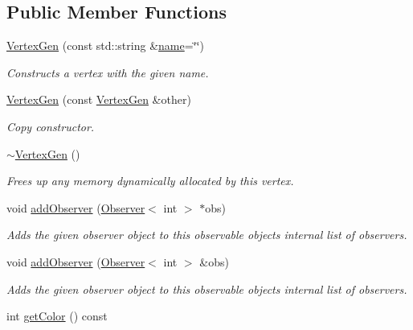 \subsection*{Public Member Functions}
\begin{DoxyCompactItemize}
\item 
\mbox{\hyperlink{classVertexGen_a9432a8935c355d36bb1f64e5e17d94de}{Vertex\+Gen}} (const std\+::string \&\mbox{\hyperlink{classVertexGen_a9b45b3e13bd9167aab02e17e08916231}{name}}=\char`\"{}\char`\"{})
\begin{DoxyCompactList}\small\item\em Constructs a vertex with the given name. \end{DoxyCompactList}\item 
\mbox{\hyperlink{classVertexGen_a90c7c6069978d9c96447e2b693bd7662}{Vertex\+Gen}} (const \mbox{\hyperlink{classVertexGen}{Vertex\+Gen}} \&other)
\begin{DoxyCompactList}\small\item\em Copy constructor. \end{DoxyCompactList}\item 
\mbox{\hyperlink{classVertexGen_a7e615c7ee4f1a16998cd37bfbf0071b3}{$\sim$\+Vertex\+Gen}} ()
\begin{DoxyCompactList}\small\item\em Frees up any memory dynamically allocated by this vertex. \end{DoxyCompactList}\item 
void \mbox{\hyperlink{classObservable_a7fa6df797eb4680c2776371f2937a1b2}{add\+Observer}} (\mbox{\hyperlink{classObserver}{Observer}}$<$ int $>$ $\ast$obs)
\begin{DoxyCompactList}\small\item\em Adds the given observer object to this observable object\textquotesingle{}s internal list of observers. \end{DoxyCompactList}\item 
void \mbox{\hyperlink{classObservable_a49fbc8dd9a3300429f7f575dc7ba0be8}{add\+Observer}} (\mbox{\hyperlink{classObserver}{Observer}}$<$ int $>$ \&obs)
\begin{DoxyCompactList}\small\item\em Adds the given observer object to this observable object\textquotesingle{}s internal list of observers. \end{DoxyCompactList}\item 
int \mbox{\hyperlink{classVertexGen_a0a56fe92b545a9b650fe5cde9a756ea7}{get\+Color}} () const

\end{DoxyCompactItemize}
